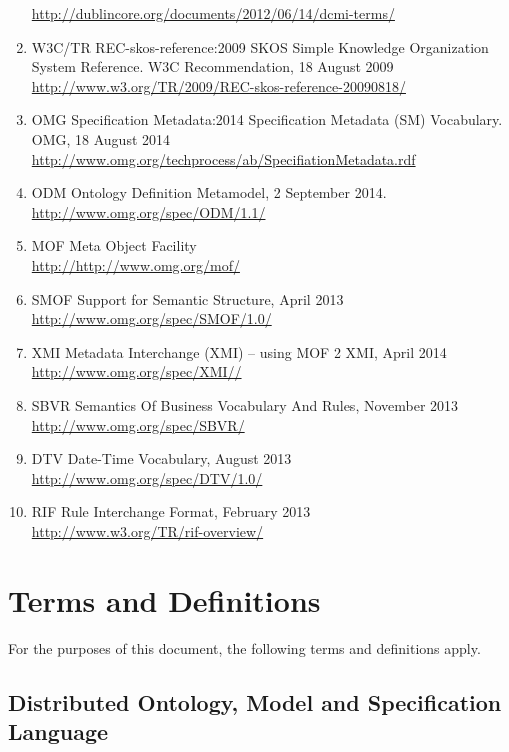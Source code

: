 \documentclass[10pt,fleqn,final]{scrreprt}
\newcommand{\clause}[1]{\chapter{#1}}
\newcommand{\sclause}[1]{\section{#1}}
\begin{document}
\begin{enumerate}[label=\bfseries NR\arabic*:]
{     \url{http://dublincore.org/documents/2012/06/14/dcmi-terms/}}
  \item{W3C/TR REC-skos-reference:2009} {SKOS Simple Knowledge Organization System
Reference.  W3C Recommendation, 18 August 2009\\ \url{http://www.w3.org/TR/2009/REC-skos-reference-20090818/}}
  \item{OMG Specification Metadata:2014} {Specification Metadata (SM) Vocabulary.  OMG, 18 August 2014\\
\url{http://www.omg.org/techprocess/ab/SpecifiationMetadata.rdf}}



  \item{ODM} {Ontology Definition Metamodel, 2 September 2014. \\ \url{http://www.omg.org/spec/ODM/1.1/}}
\item{MOF} { Meta Object Facility} \\ \url{http://http://www.omg.org/mof/}
\item{SMOF} { Support for Semantic Structure, April 2013} \\ \url{http://www.omg.org/spec/SMOF/1.0/}
\item{XMI} {Metadata Interchange (XMI) – using MOF 2 XMI, April 2014} \\ \url{http://www.omg.org/spec/XMI//}
\item{SBVR} {Semantics Of Business Vocabulary And Rules, November 2013} \\ \url{http://www.omg.org/spec/SBVR/}
\item{DTV} {Date-Time Vocabulary, August 2013} \\ \url{http://www.omg.org/spec/DTV/1.0/}
\item{RIF} {Rule Interchange Format, February 2013} \\ \url{http://www.w3.org/TR/rif-overview/}
\end{enumerate}




\clause{Terms and Definitions}\label{terms-and-defs}

For the purposes of this document, the following terms and definitions apply.

\sclause{Distributed Ontology, Model and Specification Language}
\end{document}
